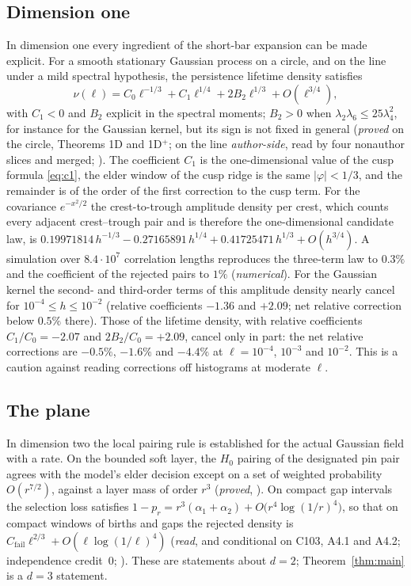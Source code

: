 \subsection{Dimension one}\label{ssec:d1}
In dimension one every ingredient of the short-bar expansion can be made explicit. For a smooth stationary Gaussian process on a circle, and on the line under a mild spectral hypothesis, the persistence lifetime density satisfies
\[
\nu(\ell)=C_0\ell^{-1/3}+C_1\ell^{1/4}+2B_2\ell^{1/3}+O(\ell^{3/4}),
\]
with $C_1<0$ and $B_2$ explicit in the spectral moments; $B_2>0$ when $\lambda_2\lambda_6\le25\lambda_4^2$, for instance for the Gaussian kernel, but its sign is not fixed in general (\emph{proved} on the circle, Theorems 1D and 1D$^+$; on the line \emph{author-side}, read by four nonauthor slices and merged; ). The coefficient $C_1$ is the one-dimensional value of the cusp formula \eqref{eq:c1}, the elder window of the cusp ridge is the same $|\varphi|<1/3$, and the remainder is of the order of the first correction to the cusp term. For the covariance $e^{-x^2/2}$ the crest-to-trough amplitude density per crest, which counts every adjacent crest--trough pair and is therefore the one-dimensional candidate law, is $0.19971814\,h^{-1/3}-0.27165891\,h^{1/4}+0.41725471\,h^{1/3}+O(h^{3/4})$. A simulation over $8.4\cdot10^7$ correlation lengths reproduces the three-term law to $0.3\%$ and the coefficient of the rejected pairs to $1\%$ (\emph{numerical}). For the Gaussian kernel the second- and third-order terms of this amplitude density nearly cancel for $10^{-4}\le h\le10^{-2}$ (relative coefficients $-1.36$ and $+2.09$; net relative correction below $0.5\%$ there). Those of the lifetime density, with relative coefficients $C_1/C_0=-2.07$ and $2B_2/C_0=+2.09$, cancel only in part: the net relative corrections are $-0.5\%$, $-1.6\%$ and $-4.4\%$ at $\ell=10^{-4}$, $10^{-3}$ and $10^{-2}$. This is a caution against reading corrections off histograms at moderate $\ell$.

\subsection{The plane}\label{ssec:plane}
In dimension two the local pairing rule is established for the actual Gaussian field with a rate. On the bounded soft layer, the $H_0$ pairing of the designated pin pair agrees with the model's elder decision except on a set of weighted probability $O(r^{7/2})$, against a layer mass of order $r^3$ (\emph{proved}, ). On compact gap intervals the selection loss satisfies $1-p_r=r^3(\alpha_1+\alpha_2)+O\bigl(r^4\log(1/r)^4\bigr)$, so that on compact windows of births and gaps the rejected density is $C_{\mathrm{fail}}\ell^{2/3}+O(\ell\log(1/\ell)^4)$ (\emph{read}, and conditional on C103, A4.1 and A4.2; independence credit~0; ). These are statements about $d=2$; Theorem~\ref{thm:main} is a $d=3$ statement.
